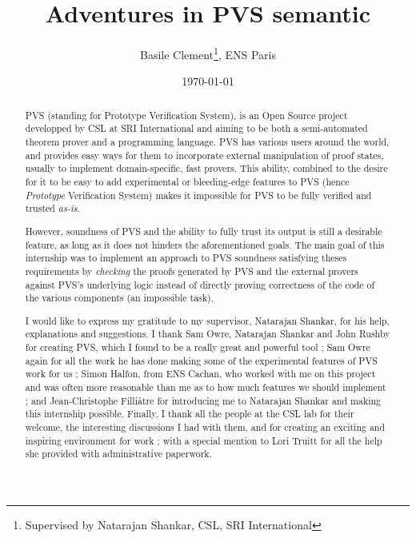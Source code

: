 \documentclass[utf8,a4paper]{article}
\title{Adventures in PVS semantic}
\author{Basile Clement\thanks{Supervised by Natarajan Shankar, CSL, SRI International}, ENS Paris}
\date{\today}
\begin{document}
\maketitle

\begin{abstract}
  PVS (standing for Prototype Verification System), is an Open Source
  project developped by CSL at SRI International and aiming to be both
  a semi-automated theorem prover and a programming language. PVS has
  various users around the world, and provides easy ways for them to
  incorporate external manipulation of proof states, usually to
  implement domain-specific, fast provers. This ability, combined to
  the desire for it to be easy to add experimental or bleeding-edge
  features to PVS (hence \textit{Prototype} Verification System) makes
  it impossible for PVS to be fully verified and trusted
  \textit{as-is}.

  However, soundness of PVS and the ability to fully trust its output
  is still a desirable feature, as long as it does not hinders the
  aforementioned goals. The main goal of this internship was to
  implement an approach to PVS soundness satisfying theses
  requirements by \textit{checking} the proofs generated by PVS and
  the external provers against PVS's underlying logic instead of
  directly proving correctness of the code of the various components
  (an impossible task).
\end{abstract}

\renewcommand{\abstractname}{Acknowledgements}
\begin{abstract}
  I would like to express my gratitude to my supervisor, Natarajan
  Shankar, for his help, explanations and suggestions. I thank Sam
  Owre, Natarajan Shankar and John Rushby for creating PVS, which I
  found to be a really great and powerful tool ; Sam Owre again for
  all the work he has done making some of the experimental features of
  PVS work for us ; Simon Halfon, from ENS Cachan, who worked with me
  on this project and was often more reasonable than me as to how much
  features we should implement ; and Jean-Christophe Filli\^atre for
  introducing me to Natarajan Shankar and making this internship
  possible. Finally, I thank all the people at the CSL lab for their
  welcome, the interesting discussions I had with them, and for
  creating an exciting and inspiring environment for work ; with a
  special mention to Lori Truitt for all the help she provided with
  administrative paperwork.
\end{abstract}
\end{document}
